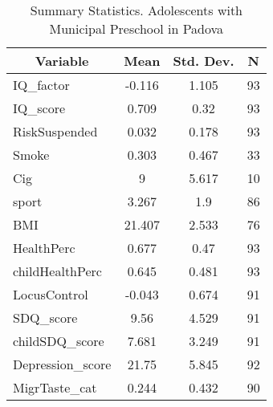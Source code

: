 
\begin{table}[htbp]\centering \caption{Summary Statistics. Adolescents with Municipal Preschool in Padova \label{bothAdolmaternaMuniPadova}}
\begin{tabular}{l c c  c}\hline\hline
\multicolumn{1}{c}{\textbf{Variable}} & \textbf{Mean}
 & \textbf{Std. Dev.} & \textbf{N}\\ \hline
IQ\_factor & -0.116 & 1.105  & 93\\
IQ\_score & 0.709 & 0.32  & 93\\
RiskSuspended & 0.032 & 0.178  & 93\\
Smoke & 0.303 & 0.467  & 33\\
Cig & 9 & 5.617  & 10\\
sport & 3.267 & 1.9  & 86\\
BMI & 21.407 & 2.533  & 76\\
HealthPerc & 0.677 & 0.47  & 93\\
childHealthPerc & 0.645 & 0.481  & 93\\
LocusControl & -0.043 & 0.674  & 91\\
SDQ\_score & 9.56 & 4.529  & 91\\
childSDQ\_score & 7.681 & 3.249  & 91\\
Depression\_score & 21.75 & 5.845  & 92\\
MigrTaste\_cat & 0.244 & 0.432  & 90\\
\hline\end{tabular}
\end{table}
